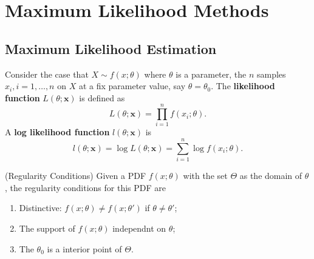 \section{Maximum Likelihood Methods}

\subsection{Maximum Likelihood Estimation}
\begin{definition}
Consider the case that $X\sim f(x;\theta)$ where $\theta$ is a parameter, the $n$ samples $x_i,i=1,\dots,n$ on $X$ at a fix parameter value, say $\theta = \theta_0$. The \textbf{likelihood function} $L(\theta;\boldsymbol{x})$ is defined as
\begin{equation}
L(\theta;\boldsymbol{x})=\prod_{i=1}^nf(x_i;\theta).
\end{equation}
A \textbf{log likelihood function} $l(\theta;\boldsymbol{x})$ is
\begin{equation}
l(\theta;\boldsymbol{x})=\log L(\theta;\boldsymbol{x})=\sum_{i=1}^n\log f(x_i;\theta).
\end{equation}
\end{definition}

\begin{definition}(Regularity Conditions)
Given a PDF $f(x;\theta)$ with the set $\Theta$ as the domain of $\theta$, the regularity conditions for this PDF are
\begin{enumerate}
	\item Distinctive: $f(x;\theta)\ne f(x;\theta')$ if $\theta\ne\theta'$;
	\item The support of $f(x;\theta)$ independnt on $\theta$;
	\item The $\theta_0$ is a interior point of $\Theta$.
\end{enumerate}
\end{definition}
